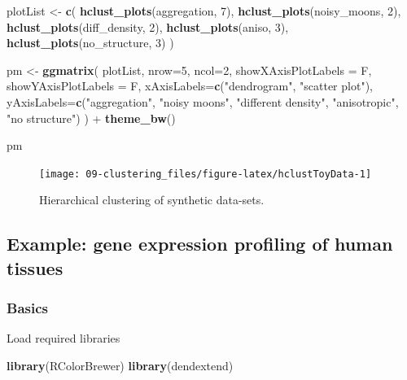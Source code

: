 \documentclass[]{book}
\newenvironment{Shaded}{\begin{snugshade}}{\end{snugshade}}
\newcommand{\KeywordTok}[1]{\textcolor[rgb]{0.13,0.29,0.53}{\textbf{{#1}}}}
\newcommand{\DataTypeTok}[1]{\textcolor[rgb]{0.13,0.29,0.53}{{#1}}}
\newcommand{\DecValTok}[1]{\textcolor[rgb]{0.00,0.00,0.81}{{#1}}}
\newcommand{\StringTok}[1]{\textcolor[rgb]{0.31,0.60,0.02}{{#1}}}
\newcommand{\NormalTok}[1]{{#1}}
\theoremstyle{definition}
\theoremstyle{definition}
\theoremstyle{definition}
\theoremstyle{remark}
\begin{document}
\begin{Shaded}
\begin{Highlighting}[]
\NormalTok{plotList <-}\StringTok{ }\KeywordTok{c}\NormalTok{(}
  \KeywordTok{hclust_plots}\NormalTok{(aggregation, }\DecValTok{7}\NormalTok{),}
  \KeywordTok{hclust_plots}\NormalTok{(noisy_moons, }\DecValTok{2}\NormalTok{),}
  \KeywordTok{hclust_plots}\NormalTok{(diff_density, }\DecValTok{2}\NormalTok{),}
  \KeywordTok{hclust_plots}\NormalTok{(aniso, }\DecValTok{3}\NormalTok{),}
  \KeywordTok{hclust_plots}\NormalTok{(no_structure, }\DecValTok{3}\NormalTok{)}
\NormalTok{)}

\NormalTok{pm <-}\StringTok{ }\KeywordTok{ggmatrix}\NormalTok{(}
  \NormalTok{plotList, }\DataTypeTok{nrow=}\DecValTok{5}\NormalTok{, }\DataTypeTok{ncol=}\DecValTok{2}\NormalTok{, }\DataTypeTok{showXAxisPlotLabels =} \NormalTok{F, }\DataTypeTok{showYAxisPlotLabels =} \NormalTok{F,}
  \DataTypeTok{xAxisLabels=}\KeywordTok{c}\NormalTok{(}\StringTok{"dendrogram"}\NormalTok{, }\StringTok{"scatter plot"}\NormalTok{), }
  \DataTypeTok{yAxisLabels=}\KeywordTok{c}\NormalTok{(}\StringTok{"aggregation"}\NormalTok{, }\StringTok{"noisy moons"}\NormalTok{, }\StringTok{"different density"}\NormalTok{, }\StringTok{"anisotropic"}\NormalTok{, }\StringTok{"no structure"}\NormalTok{)}
\NormalTok{) +}\StringTok{ }\KeywordTok{theme_bw}\NormalTok{()}

\NormalTok{pm}
\end{Highlighting}
\end{Shaded}

\begin{figure}

{\centering \texttt{[image: 09-clustering\_files/figure-latex/hclustToyData-1]} 

}

\caption{Hierarchical clustering of synthetic data-sets. }\label{fig:hclustToyData}
\end{figure}

\subsection{Example: gene expression profiling of human
tissues}\label{example-gene-expression-profiling-of-human-tissues}

\subsubsection{Basics}\label{basics}

Load required libraries

\begin{Shaded}
\begin{Highlighting}[]
\KeywordTok{library}\NormalTok{(RColorBrewer)}
\KeywordTok{library}\NormalTok{(dendextend)}
\end{Highlighting}
\end{Shaded}
\end{document}
